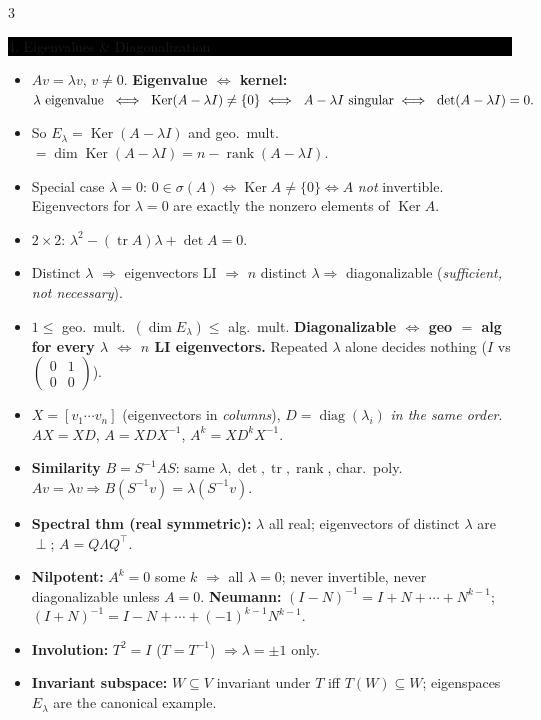 \documentclass[8pt,letterpaper]{article}
\makeatletter
\newcommand{\sect}[1]{%
  \vspace{2.2pt}%
  \noindent\colorbox{black}{\parbox{\dimexpr\linewidth-2\fboxsep}{%
    \color{white}\bfseries\scshape\fontsize{6.4}{7.4}\selectfont
    \hyphenpenalty=10000\exhyphenpenalty=10000\raggedright #1}}%
  \vspace{1.4pt}\par\nopagebreak\@afterheading}
\newenvironment{tl}
  {\begin{itemize}[leftmargin=6pt,itemsep=0.3pt,topsep=1pt,parsep=0pt,
                   partopsep=0pt,label=\textcolor{gray}{\tiny$\bullet$}]}
  {\end{itemize}}
\newcommand{\tr}{\operatorname{tr}}
\newcommand{\rank}{\operatorname{rank}}
\newcommand{\Ker}{\operatorname{Ker}}
\newcommand{\tp}{^{\!\top}}
\makeatother
\begin{document}
\begin{multicols}{3}
\sect{4. Eigenvalues \& Diagonalization}
\begin{tl}
\item $Av=\lambda v$, $v\neq0$. \textbf{Eigenvalue $\iff$ kernel:}
$\lambda\text{ eigenvalue}\ \iff\ \Ker(A-\lambda I)\neq\{0\}\\
\iff\ A-\lambda I\ \text{singular}\\
\iff\ \det(A-\lambda I)=0.$
\item So $E_\lambda=\Ker(A-\lambda I)$ and geo.\ mult.\ $=\dim\Ker(A-\lambda I)=n-\rank(A-\lambda I)$.
\item Special case $\lambda=0$: $0\in\sigma(A)\iff\Ker A\neq\{0\}\iff A$ \emph{not} invertible. Eigenvectors for $\lambda=0$ are exactly the nonzero elements of $\Ker A$.
\item $2\times2$: $\lambda^2-(\tr A)\lambda+\det A=0$.
\item Distinct $\lambda$ $\Rightarrow$ eigenvectors LI $\Rightarrow$ $n$ distinct $\lambda\Rightarrow$ diagonalizable (\emph{sufficient, not necessary}).
\item $1\le$ geo.\ mult.\ $(\dim E_\lambda)\le$ alg.\ mult. \textbf{Diagonalizable $\iff$ geo $=$ alg for every $\lambda$ $\iff$ $n$ LI eigenvectors.} Repeated $\lambda$ alone decides nothing ($I$ vs $\left(\begin{smallmatrix}0&1\\0&0\end{smallmatrix}\right)$).
\item $X=[v_1\cdots v_n]$ (eigenvectors in \emph{columns}), $D=\operatorname{diag}(\lambda_i)$ \emph{in the same order}. $AX=XD$, $A=XDX^{-1}$, \textbf{$A^k=XD^kX^{-1}$}.
\item \textbf{Similarity} $B=S^{-1}AS$: same $\lambda,\det,\tr,\rank$, char.\ poly. $Av=\lambda v\Rightarrow B(S^{-1}v)=\lambda(S^{-1}v)$.
\item \textbf{Spectral thm (real symmetric):} $\lambda$ all real; eigenvectors of distinct $\lambda$ are $\perp$; $A=Q\Lambda Q\tp$.
\item \textbf{Nilpotent:} $A^k=0$ some $k$ $\Rightarrow$ all $\lambda=0$; never invertible, never diagonalizable unless $A=0$. \textbf{Neumann:} $(I-N)^{-1}=I+N+\cdots+N^{k-1}$; $(I+N)^{-1}=I-N+\cdots+(-1)^{k-1}N^{k-1}$.
\item \textbf{Involution:} $T^2=I$ ($T=T^{-1}$) $\Rightarrow\lambda=\pm1$ only.
\item \textbf{Invariant subspace:} $W\subseteq V$ invariant under $T$ iff $T(W)\subseteq W$; eigenspaces $E_\lambda$ are the canonical example.
\end{tl}
\vspace{\baselineskip}


\end{multicols}
\end{document}
